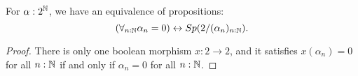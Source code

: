 \begin{lemma}\label{ClosedPropAsSpectrum}
  For $\alpha:2^{\mathbb{N}}$, we have an equivalence of propositions: 
 \[ 
    (\forall_{n:\mathbb{N}} \alpha_n = 0 )\leftrightarrow Sp(2/(\alpha_n)_{n:\mathbb{N}}).
  \] 
\end{lemma}
\begin{proof}
  There is only one boolean morphism $x:2\to 2$, and it satisfies 
  $x(\alpha_n) = 0$ for all $n:\mathbb{N}$ if and only if
  $\alpha_n = 0$ for all $n:\mathbb{N}$. 
\end{proof}





